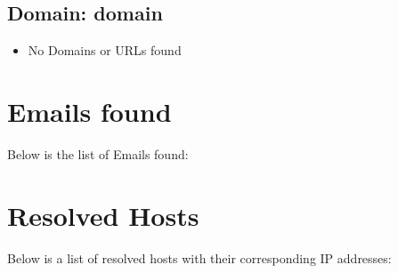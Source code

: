\documentclass{article}
\begin{document}
{%
    {%
    \subsection{Domain: {{ domain }}}
{%
{%
\begin{itemize}
    \item No Domains or URLs found
\end{itemize}
{%

\clearpage

\section{Emails found}

Below is the list of Emails found:


\clearpage

\section{Resolved Hosts}

Below is a list of resolved hosts with their corresponding IP addresses:


}}}}}
\end{document}
